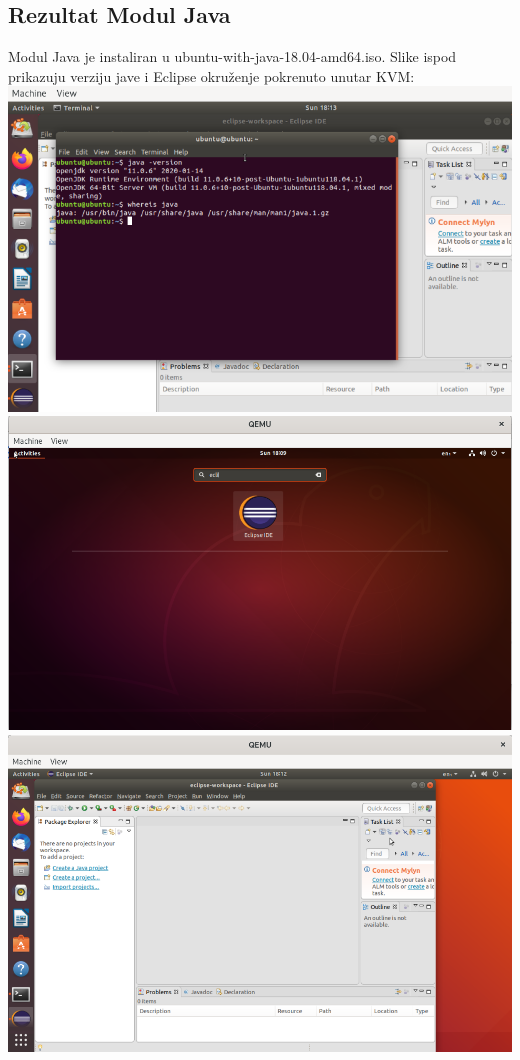 \documentclass[12pt,vi]{mitthesis}
\begin{document}
\subsection*{Rezultat Modul Java}
\indent
Modul Java je instaliran u ubuntu-with-java-18.04-amd64.iso.
Slike ispod prikazuju verziju jave i Eclipse okruženje pokrenuto unutar KVM:\\
\includegraphics[width=\linewidth]{images/javaLive.png}\\
\includegraphics[width=\linewidth]{images/eclipseLive.png}\\ 
\includegraphics[width=\linewidth]{images/eclipseLive1.png}
\newpage
\end{document}
